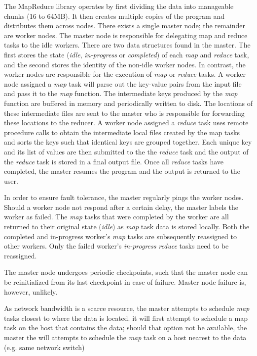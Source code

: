 \documentclass{report}
\begin{document}
The MapReduce library operates by first dividing the data into manageable chunks (16 to 64MB). It then creates multiple copies of the
program and distributes them across nodes. There exists a single master node; the remainder are worker nodes. The master node is
responsible for delegating map and reduce tasks to the idle workers. There are two data structures found in the master. The first stores the
state (\textit{idle}, \textit{in-progress} or \textit{completed}) of each \textit{map} and \textit{reduce} task, and the second stores the identity of
the non-idle worker nodes. In contrast, the worker nodes are responsible for the execution of \textit{map} or \textit{reduce} tasks. A worker
node assigned a \textit{map} task will parse out the key-value pairs from the input file and pass it to the \textit{map} function. The
intermediate keys produced by the \textit{map} function are buffered in memory and periodically written to disk. The locations of these
intermediate files are sent to the master who is responsible for forwarding these locations to the reducer. A worker node assigned a 
\textit{reduce} task uses remote procedure calls to obtain the intermediate local files created by the map tasks and sorts the keys such that 
identical keys are grouped together. Each unique key and its list of values are then submitted to the the \textit{reduce} task and the output of 
the \textit{reduce} task is stored in a final output file. Once all \textit{reduce} tasks have completed, the master resumes the program and the 
output is returned to the user.

In order to ensure fault tolerance, the master regularly pings the worker nodes. Should a worker node not respond after a certain delay, the 
master labels the worker as failed. The \textit{map} tasks that were completed by the worker are all returned to their original state 
(\textit{idle}) as \textit{map} task data is stored locally. Both the completed and in-progress worker's \textit{map} tasks are subsequently 
reassigned to other workers. Only the failed worker's \textit{in-progress} \textit{reduce} tasks need to be reassigned.

The master node undergoes periodic checkpoints, such that the master node can be reinitialized from its last checkpoint in case of failure. 
Master node failure is, however, unlikely.

As network bandwidth is a scarce resource, the master attempts to schedule \textit{map} tasks closest to where the data is located. it will first 
attempt to schedule a map task on the host that contains the data; should that option not be available, the master the will attempts to 
schedule the \textit{map} task on a host nearest to the data (e.g. same network switch)
\end{document}
